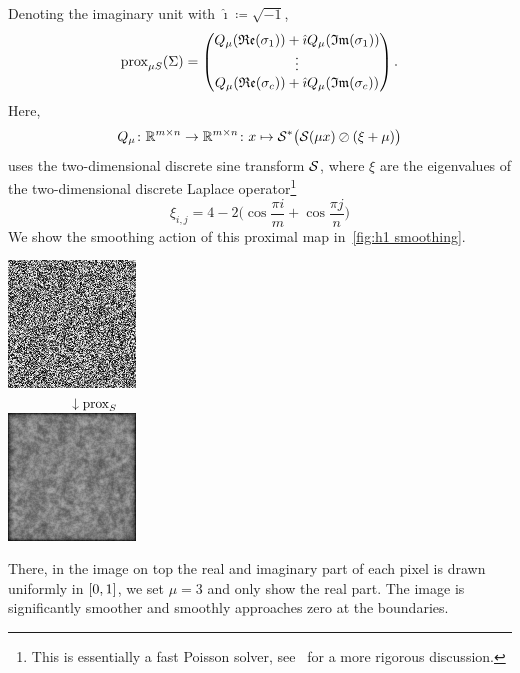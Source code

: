 Denoting the imaginary unit with \( \hat{\imath} \coloneqq \sqrt{\num{-1}} \),
\begin{equation}
	\prox_{\mu S}(\Sigma) = \begin{pmatrix}
		Q_\mu(\mathfrak{Re}(\sigma_{\num{1}})) + \hat{\imath} Q_\mu(\mathfrak{Im}(\sigma_{\num{1}})) \\
		\vdotswithin{%
			Q_\mu(\mathfrak{Re}(\sigma_c)) + \hat{\imath} Q_\mu(\mathfrak{Im}(\sigma_c))
		} \\
		Q_\mu(\mathfrak{Re}(\sigma_c)) + \hat{\imath} Q_\mu(\mathfrak{Im}(\sigma_c))
	\end{pmatrix}.
\end{equation}
Here,
\begin{equation}
	Q_\mu \colon \mathbb{R}^{m\times n} \to \mathbb{R}^{m\times n} \colon x \mapsto \mathcal{S}^{\ast} \bigl(\mathcal{S}(\mu x) \oslash (\xi + \mu) \bigr)
\end{equation}
uses the two-dimensional discrete sine transform \( \mathcal{S} \), where \( \xi \) are the eigenvalues of the two-dimensional discrete Laplace operator\footnote{%
	This is essentially a fast Poisson solver, see~\cite[Chapter 19.4]{press_numerical_1992} for a more rigorous discussion.%
}
\begin{equation}
	\xi_{i, j} = \num{4} - \num{2} \bigl(\cos \frac{\pi i}{m} + \cos \frac{\pi j}{n} \bigr)
\end{equation}
We show the smoothing action of this proximal map in~\cref{fig:h1 smoothing}.
\begin{sidefigure}
	\centering
	\includegraphics[width=\marginparwidth]{prox/input}\\
	\ \ \ \ \ \ \ \ \ \( \downarrow \operatorname{prox}_{S} \)\\
	\includegraphics[width=\marginparwidth]{prox/proxed}
	\caption[Smoothing via proximal map of quadratic gradient norm]{%
		The smoothing action of the proximal operator with respect to quadratic gradient penalization with Dirichlet boundary conditions.
	}%
	\label{fig:h1 smoothing}
\end{sidefigure}
There, in the image on top the real and imaginary part of each pixel is drawn uniformly in \( \interval{\num{0}}{\num{1}} \), we set \( \mu = \num{3} \) and only show the real part.
The image is significantly smoother and smoothly approaches zero at the boundaries.

